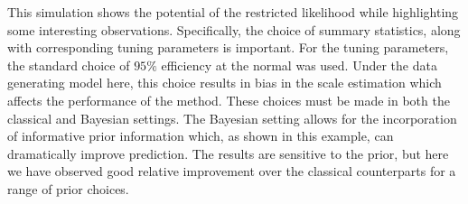\documentclass[ba]{imsart}
\begin{document}
This simulation shows the potential of the restricted likelihood while highlighting some interesting observations. Specifically, the choice of summary statistics, along with corresponding tuning parameters is important. For the tuning parameters, the standard choice of $95\%$ efficiency at the normal was used.  Under the data generating model here, this choice results in bias in the scale estimation which affects the performance of the method. These choices must be made in both the classical and Bayesian settings. The Bayesian setting allows for the incorporation of informative prior information which, as shown in this example, can dramatically improve prediction. The results are sensitive to the prior, but here we have observed good relative improvement over the classical counterparts for a range of prior choices.   

%



%
%
\end{document}
